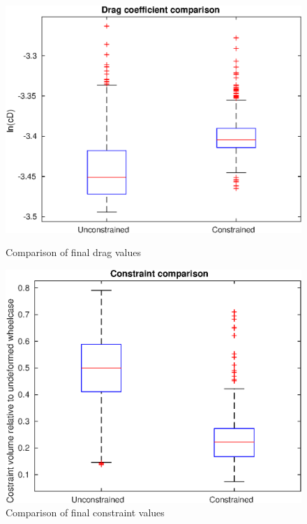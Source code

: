 \begin{figure}[h]
	\centering
	\begin{minipage}{0.45\textwidth}
		\centering
		\includegraphics[width=1\linewidth]{bilder/6pt1000Samples/dragBoxplot}
		\caption{Comparison of final drag values}
		\label{fig:3rddragbox}
	\end{minipage}\hfill
	\begin{minipage}{0.45\textwidth}
		\centering
		\includegraphics[width=1\linewidth]{bilder/6pt1000Samples/constraintBoxplot}
		\caption{Comparison of final constraint values}
		\label{fig:3rdconbox}
	\end{minipage}
\end{figure}

